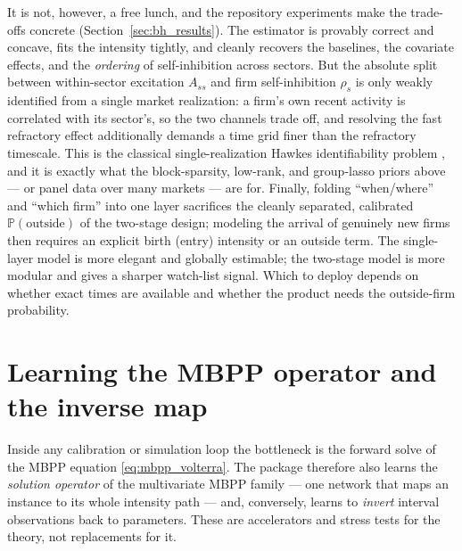 \documentclass[11pt]{article}
\theoremstyle{plain}
\theoremstyle{definition}
\theoremstyle{remark}
\newcommand{\Prob}{\mathbb{P}}
\begin{document}
It is not, however, a free lunch, and the repository experiments make the trade-offs concrete (Section~\ref{sec:bh_results}). The estimator is provably correct and concave, fits the intensity tightly, and cleanly recovers the baselines, the covariate effects, and the \emph{ordering} of self-inhibition across sectors. But the absolute split between within-sector excitation $A_{ss}$ and firm self-inhibition $\rho_s$ is only weakly identified from a single market realization: a firm's own recent activity is correlated with its sector's, so the two channels trade off, and resolving the fast refractory effect additionally demands a time grid finer than the refractory timescale. This is the classical single-realization Hawkes identifiability problem \citep{bacry2015,zhou2013}, and it is exactly what the block-sparsity, low-rank, and group-lasso priors above --- or panel data over many markets --- are for. Finally, folding ``when/where'' and ``which firm'' into one layer sacrifices the cleanly separated, calibrated $\Prob(\text{outside})$ of the two-stage design; modeling the arrival of genuinely new firms then requires an explicit birth (entry) intensity or an outside term. The single-layer model is more elegant and globally estimable; the two-stage model is more modular and gives a sharper watch-list signal. Which to deploy depends on whether exact times are available and whether the product needs the outside-firm probability.

\section{Learning the MBPP operator and the inverse map}
\label{sec:operators}

Inside any calibration or simulation loop the bottleneck is the forward solve of the MBPP equation \eqref{eq:mbpp_volterra}. The package therefore also learns the \emph{solution operator} of the multivariate MBPP family --- one network that maps an instance to its whole intensity path --- and, conversely, learns to \emph{invert} interval observations back to parameters. These are accelerators and stress tests for the theory, not replacements for it.
\end{document}
